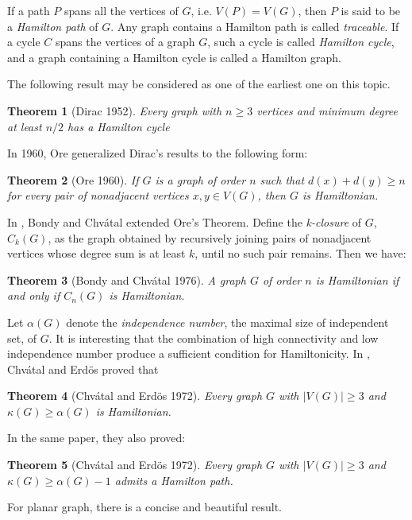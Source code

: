 \documentclass[12pt]{report}
\newtheorem{theorem}{Theorem}
\begin{document}
If a path $P$ spans all the vertices of $G$, i.e. $V(P)=V(G)$, then $P$ is said to be a {\em Hamilton path} of $G$. Any graph contains a Hamilton path is called {\em traceable}. If a cycle $C$ spans the vertices of a graph $G$, such a cycle is called {\em Hamilton cycle}, and a graph containing a Hamilton cycle is called a Hamilton graph.

The following result may be considered as one of the earliest one on this topic.

\begin{theorem}[Dirac 1952]\label{dirac1952th}
Every graph with $n\ge3$ vertices and minimum degree at least $n/2$ has a Hamilton cycle
\end{theorem}


In 1960, Ore generalized Dirac's results to the following form:
\begin{theorem}[Ore 1960]\label{ore1960hth1}
If $G$ is a graph of order $n$ such that $d(x)+d(y)\ge n$ for every pair of nonadjacent vertices $x,y\in V(G)$, then $G$ is Hamiltonian.
\end{theorem}

In \cite{bondy1976a}, Bondy and Chv{\'a}tal extended Ore's Theorem. Define the {\em k-closure} of $G$, $C_k(G)$, as the graph obtained by recursively joining pairs of nonadjacent vertices whose degree sum is at least $k$, until no such pair remains. Then we have:
\begin{theorem}[Bondy and Chv{\'a}tal 1976]\label{thmcloham1}
A graph $G$ of order $n$ is Hamiltonian if and only if $C_n(G)$ is Hamiltonian.
\end{theorem}

Let $\alpha(G)$ denote the {\em independence number}, the maximal size of independent set, of $G$. It is interesting that the combination of high connectivity and low independence number produce a sufficient condition for Hamiltonicity. In \cite{chvatal1972a}, Chv{\'a}tal and Erd{\"o}s proved that
\begin{theorem}[Chv{\'a}tal and Erd{\"o}s 1972]\label{kageaptohathe}
Every graph $G$ with $|V(G)|\ge3$ and $\kappa(G)\ge\alpha(G)$ is Hamiltonian.
\end{theorem}
In the same paper, they also proved:
\begin{theorem}[Chv{\'a}tal and Erd{\"o}s 1972]\label{thmce15}
Every graph $G$ with $|V(G)|\ge3$ and $\kappa(G)\ge\alpha(G)-1$ admits a Hamilton path.
\end{theorem}

For planar graph, there is a concise and beautiful result.
\end{document}
